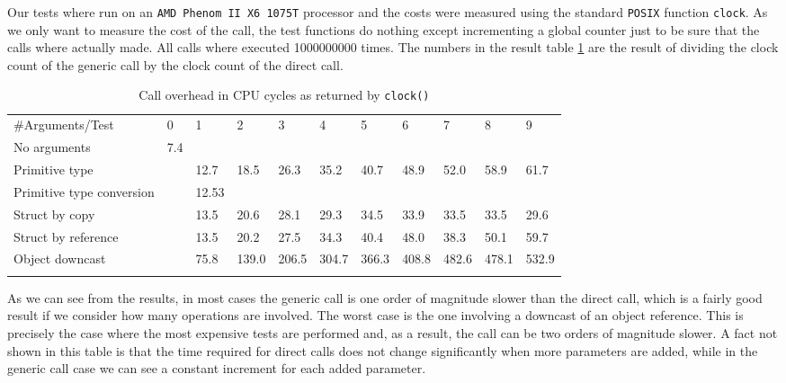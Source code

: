 Our tests where run on an \texttt{AMD Phenom II X6 1075T} processor and the costs were measured using the standard \texttt{POSIX} function \texttt{clock}.
As we only want to measure the cost of the call, the test functions do nothing except incrementing a global counter just to be sure that the calls where
actually made. All calls where executed 1000000000 times. The numbers in the result table \ref{tab:overhead} are the result of dividing the clock count of the generic call
by the clock count of the direct call.

\begin{landscape}
 

\begin{table}
\caption {Call overhead in CPU cycles as returned by \texttt{clock()}} \label{tab:overhead} 

\begin{center}

\begin{tabular}{lllllllllll}
\hline\noalign{\smallskip}
\#Arguments/Test & 0 & 1 & 2 & 3 & 4 & 5 & 6 & 7 & 8 & 9\\
\noalign{\smallskip}
\hline
\noalign{\smallskip}
No arguments & 7.4 &&&&&&&&&\\
Primitive type && 12.7 & 18.5 & 26.3 & 35.2 & 40.7 & 48.9 & 52.0 & 58.9 & 61.7\\
Primitive type conversion && 12.53 &&&&&&&&\\
Struct by copy && 13.5 & 20.6 & 28.1 & 29.3 & 34.5 & 33.9 & 33.5 & 33.5 & 29.6\\
Struct by reference && 13.5 & 20.2 & 27.5 & 34.3 & 40.4 & 48.0 & 38.3 & 50.1 & 59.7\\
Object downcast && 75.8 & 139.0 & 206.5 & 304.7 & 366.3 & 408.8 & 482.6 & 478.1 & 532.9\\
\noalign{\smallskip}
\hline
\end{tabular}

\end{center}
\end{table}
\end{landscape}

As we can see from the results, in most cases the generic call is one order of magnitude slower than the direct call, which is a fairly good result
if we consider how many operations are involved. The worst case is the one involving a downcast of an object reference. This is precisely the case
where the most expensive tests are performed and, as a result, the call can be two orders of magnitude slower. A fact not shown in this table is that
the time required for direct calls does not change significantly when more parameters are added, while in the generic call case we can see a
constant increment for each added parameter.

